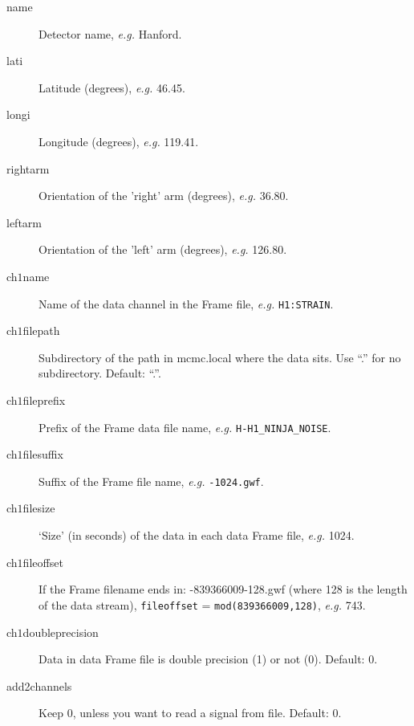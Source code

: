 \documentclass[10pt]{article}
\begin{document}
\begin{description}
\item[name] Detector name, \textit{e.g.} Hanford.
\item[lati] Latitude (degrees), \textit{e.g.} 46.45.
\item[longi] Longitude (degrees), \textit{e.g.} 119.41.
\item[rightarm] Orientation of the 'right' arm (degrees), \textit{e.g.} 36.80.
\item[leftarm] Orientation of the 'left' arm (degrees), \textit{e.g.} 126.80.
                                                                                                                                                                                                               
\item[ch$1$name] Name of the data channel in the Frame file, \textit{e.g.} \texttt{H1:STRAIN}.
\item[ch$1$filepath] Subdirectory of the path in mcmc.local where the data sits.  Use ``.'' for no subdirectory.  Default: ``.''.
\item[ch$1$fileprefix] Prefix of the Frame data file name, \textit{e.g.} \texttt{H-H1\_NINJA\_NOISE}.
\item[ch$1$filesuffix] Suffix of the Frame file name, \textit{e.g.} \texttt{-1024.gwf}.
\item[ch$1$filesize] `Size' (in seconds) of the data in each data Frame file, \textit{e.g.} 1024.
\item[ch$1$fileoffset] If the Frame filename ends in: -839366009-128.gwf (where 128 is the length of the data stream), \texttt{fileoffset} = \texttt{mod(839366009,128)}, \textit{e.g.} 743.
\item[ch$1$doubleprecision] Data in data Frame file is double precision (1) or not (0).  Default: 0.
\item[add2channels] Keep 0, unless you want to read a signal from file.  Default: 0.


\end{description}
\end{document}
